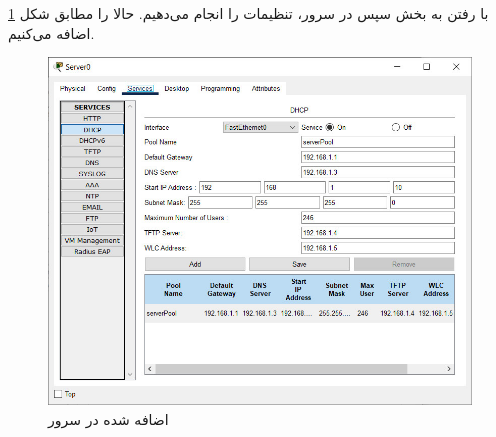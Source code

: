 \documentclass{article}
\begin{document}
با رفتن به بخش  سپس  در سرور، تنظیمات را انجام می‌دهیم.
حالا  را مطابق شکل \ref{fig:s-1-server-pool} اضافه می‌کنیم.
 \begin{figure}[h!]
	\centering
	\includegraphics[width=0.5\columnwidth]{figs/s-1-server-pool.jpg}
	\caption{ اضافه شده در سرور}
	\label{fig:s-1-server-pool}
\end{figure}
\end{document}
